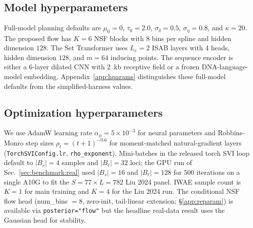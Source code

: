 \subsection{Model hyperparameters}
Full-model planning defaults are $\mu_0=0$, $\tau_0=2.0$, $\sigma_\delta=0.5$, $\sigma_\eta=0.8$, and $\kappa=20$. The proposed flow has $K=6$ NSF blocks with 8 bins per spline and hidden dimension $128$. The Set Transformer uses $L_e=2$ ISAB layers with 4 heads, hidden dimension $128$, and $m=64$ inducing points. The sequence encoder is either a 6-layer dilated CNN with 2~kb receptive field or a frozen DNA-language-model embedding. Appendix~\ref{app:hparams} distinguishes these full-model defaults from the simplified-harness values.

\subsection{Optimization hyperparameters}
We use AdamW learning rate $\alpha_\phi=5\times 10^{-3}$ for neural parameters and Robbins-Monro step sizes $\rho_t=(t+1)^{-0.6}$ for moment-matched natural-gradient layers (\texttt{TorchSVIConfig.lr}, \texttt{rho\_exponent}). Mini-batches in the released torch SVI loop default to $|B_s|=4$ samples and $|B_\ell|=32$ loci; the GPU run of Sec.~\ref{sec:benchmark:real} used $|B_s|=16$ and $|B_\ell|=128$ for $500$ iterations on a single A10G to fit the $S=77 \times L=782$ Liu 2024 panel. IWAE sample count is $K=1$ for main training and $K=4$ for the Liu 2024 run. The conditional NSF flow head (num\_bins $=8$, zero-init, tail-linear extension; \S\ref{app:reparam}) is available via \texttt{posterior="flow"} but the headline real-data result uses the Gaussian head for stability.


